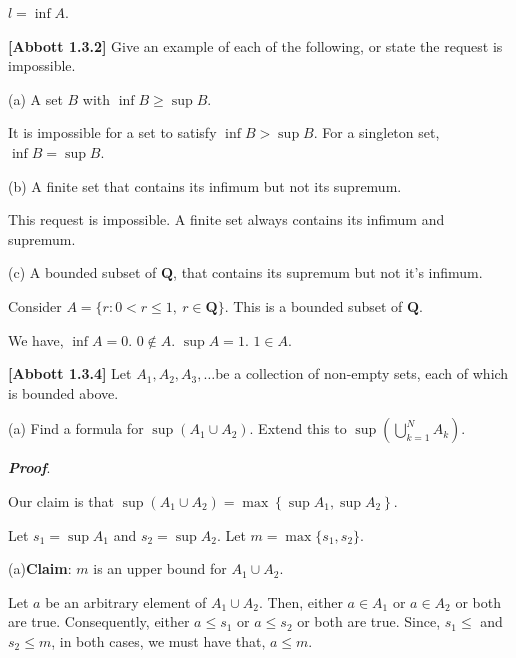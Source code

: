 \documentclass[10pt]{article}
\begin{document}
$\displaystyle l=\inf A$.



\textbf{[Abbott 1.3.2]} Give an example of each of the following, or state the request is impossible.



(a) A set $\displaystyle B$ with $\displaystyle \inf B\geq \sup B$. 



It is impossible for a set to satisfy $\displaystyle \inf B >\sup B$. For a singleton set, $\displaystyle \inf B=\sup B$.



(b) A finite set that contains its infimum but not its supremum.



This request is impossible. A finite set always contains its infimum and supremum. 



(c) A bounded subset of $\displaystyle \mathbf{Q}$, that contains its supremum but not it's infimum.



Consider $\displaystyle A=\{r:0< r\leq 1,\ r\in \mathbf{Q}\}$. This is a bounded subset of $\displaystyle \mathbf{Q}$. 

We have, $\displaystyle \inf A=0$. $\displaystyle 0\notin A$. $\displaystyle \sup A=1$. $\displaystyle 1\in A$.



\textbf{[Abbott 1.3.4] }Let $\displaystyle A_{1} ,A_{2} ,A_{3} ,\dotsc $be a collection of non-empty sets, each of which is bounded above. 



(a) Find a formula for $\displaystyle \sup ( A_{1} \cup A_{2})$. Extend this to $\displaystyle \sup \left(\bigcup _{k=1}^{N} A_{k}\right) .$



\textbf{\textit{Proof}}.

Our claim is that $\displaystyle \sup ( A_{1} \cup A_{2}) =\max\left\{\sup A_{1} ,\sup A_{2}\right\}$.

Let $\displaystyle s_{1} =\sup A_{1}$ and $\displaystyle s_{2} =\sup A_{2}$. Let $\displaystyle m=\max\{s_{1} ,s_{2}\}$.



(a)\textbf{Claim}: $\displaystyle m$ is an upper bound for $\displaystyle A_{1} \cup A_{2}$. 



Let $\displaystyle a$ be an arbitrary element of $\displaystyle A_{1} \cup A_{2}$. Then, either $\displaystyle a\in A_{1}$ or $\displaystyle a\in A_{2}$ or both are true. Consequently, either $\displaystyle a\leq s_{1}$ or $\displaystyle a\leq s_{2}$ or both are true. Since, $\displaystyle s_{1} \leq $ and $\displaystyle s_{2} \leq m$, in both cases, we must have that, $\displaystyle a\leq m$.
\end{document}
